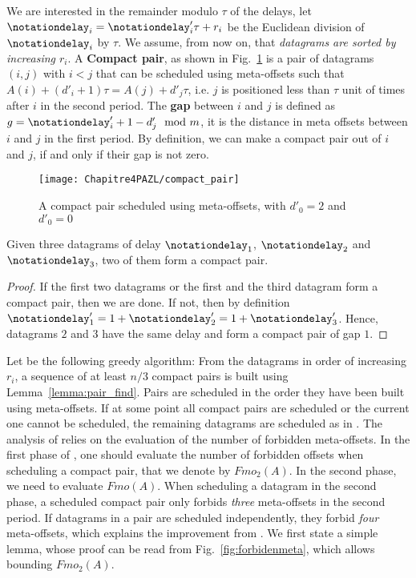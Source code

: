 We are interested in the remainder modulo $\tau$ of the delays, let $\notationdelay_i = \notationdelay_{i}'\tau + r_i$ be the Euclidean division of $\notationdelay_i$ by $\tau$. We assume, from now on, that \emph{datagrams are sorted by increasing $r_i$}.
A \textbf{Compact pair}, as shown in Fig.~\ref{fig:compactpair} is a pair of datagrams $(i,j)$ with $i < j$ that can be scheduled using meta-offsets such that $A(i) + (d'_i+1)\tau = A(j) + d'_j\tau$, i.e. $j$ is positioned less than $\tau$ unit of times after $i$ in the second period.
The \textbf{gap} between $i$ and $j$ is defined as  $g = \notationdelay_{i}' + 1 - d'_{j} \mod m$, it is the distance in meta offsets between $i$ and $j$ in the first period. By definition, we can make a compact pair out of $i$ and $j$, if and only if their gap is not zero.

\begin{figure}[h]
\begin{center}



\texttt{[image: Chapitre4PAZL/compact\_pair]}
\end{center}
\caption{A compact pair scheduled using meta-offsets, with $d'_0 = 2$ and $d'_0 = 0$}
\label{fig:compactpair}
\end{figure}

\begin{lemma}\label{lemma:pair_find}
Given three datagrams of delay $\notationdelay_{1}$, $\notationdelay_{2}$ and $\notationdelay_{3}$, two of them form a compact pair. 
\end{lemma}
\begin{proof}
If the first two datagrams or the first and the third datagram form a compact pair,
then we are done. If not, then by definition $\notationdelay_{1}' = 1 + \notationdelay_{2}' = 1 + \notationdelay_{3}'$. Hence, datagrams $2$ and $3$ have the same delay and form a compact pair of gap $1$.
\end{proof}

Let \compactpair be the following greedy algorithm: From the datagrams in order
of increasing $r_i$, a sequence of at least $n/3$ compact pairs is built using Lemma~\ref{lemma:pair_find}. Pairs are scheduled in the order they have been built using meta-offsets. If at some point all compact pairs are scheduled or the current one cannot be scheduled, the remaining datagrams are scheduled as in \metaoffset. The analysis of \compactpair relies on the evaluation of the number of forbidden meta-offsets. In the first phase of \compactpair, one should evaluate the number of forbidden offsets when scheduling a compact pair, that we denote by $Fmo_2(A)$. In the second phase, we need to evaluate $Fmo(A)$. When scheduling a datagram in the second phase, a scheduled compact pair only forbids \emph{three} meta-offsets in the second period. If datagrams in a pair are scheduled independently, they forbid \emph{four} meta-offsets, which explains the improvement from \compactpair. We first state a simple lemma, whose proof can be read from Fig.~\ref{fig:forbidenmeta}, which allows bounding $Fmo_2(A)$.

